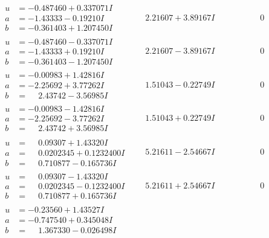 \documentclass[1p]{elsarticle_modified}
\theoremstyle{definition}
\begin{document}
$$\begin{array}{c|c|c}
\begin{aligned}
u &= -0.487460 + 0.337071 I \\
a &= -1.43333 - 0.19210 I \\
b &= -0.361403 + 1.207450 I\end{aligned}
 & \phantom{-}2.21607 + 3.89167 I & \phantom{-0.000000 } 0 \\ \hline\begin{aligned}
u &= -0.487460 - 0.337071 I \\
a &= -1.43333 + 0.19210 I \\
b &= -0.361403 - 1.207450 I\end{aligned}
 & \phantom{-}2.21607 - 3.89167 I & \phantom{-0.000000 } 0 \\ \hline\begin{aligned}
u &= -0.00983 + 1.42816 I \\
a &= -2.25692 + 3.77262 I \\
b &= \phantom{-}2.43742 - 3.56985 I\end{aligned}
 & \phantom{-}1.51043 - 0.22749 I & \phantom{-0.000000 } 0 \\ \hline\begin{aligned}
u &= -0.00983 - 1.42816 I \\
a &= -2.25692 - 3.77262 I \\
b &= \phantom{-}2.43742 + 3.56985 I\end{aligned}
 & \phantom{-}1.51043 + 0.22749 I & \phantom{-0.000000 } 0 \\ \hline\begin{aligned}
u &= \phantom{-}0.09307 + 1.43320 I \\
a &= \phantom{-}0.0202345 + 0.1232400 I \\
b &= \phantom{-}0.710877 - 0.165736 I\end{aligned}
 & \phantom{-}5.21611 - 2.54667 I & \phantom{-0.000000 } 0 \\ \hline\begin{aligned}
u &= \phantom{-}0.09307 - 1.43320 I \\
a &= \phantom{-}0.0202345 - 0.1232400 I \\
b &= \phantom{-}0.710877 + 0.165736 I\end{aligned}
 & \phantom{-}5.21611 + 2.54667 I & \phantom{-0.000000 } 0 \\ \hline\begin{aligned}
u &= -0.23560 + 1.43527 I \\
a &= -0.747540 + 0.345048 I \\
b &= \phantom{-}1.367330 - 0.026498 I\end{aligned}

\end{array}$$
\end{document}
